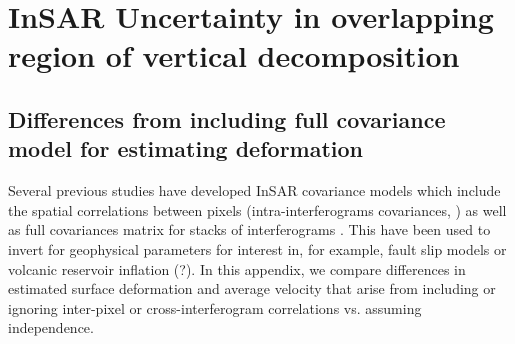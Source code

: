 
\chapter{InSAR Uncertainty in overlapping region of vertical decomposition}

%

\section{Differences from including full covariance model for estimating deformation}

Several previous studies have developed InSAR covariance models which include the spatial correlations between pixels (intra-interferograms covariances, \citep{Lohman2005SomeThoughtsUse, Simons2007InterferometricSyntheticAperture}) as well as full covariances matrix for stacks of interferograms \citep{Agram2015NoiseModelInsar, Jolivet2018MultipixelTimeSeries}. This have been used to invert for geophysical parameters for interest in, for example, fault slip models \citep{Lohman2005SomeThoughtsUse, Jolivet2018MultipixelTimeSeries} or volcanic reservoir inflation (?). In this appendix, we compare differences in estimated surface deformation and average velocity that arise from including or ignoring inter-pixel or cross-interferogram correlations vs. assuming independence.


